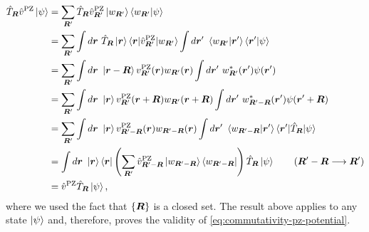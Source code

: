 \begin{equation}
    \begin{split}
        \hat{T}_{{\bm R}} \hat{v}^{\rm PZ} \ket{\psi} &= \sum_{{\bm R}'} \hat{T}_{{\bm R}} \hat{v}^{\rm PZ}_{{\bm R}'} \ket{w_{{\bm R}'}} \braket{w_{{\bm R}'}|\psi} \\
        &= \sum_{{\bm R}'} \int d{\bm r} \ \hat{T}_{{\bm R}} \ket{{\bm r}} \braket{{\bm r}|\hat{v}^{\rm PZ}_{{\bm R}'}|w_{{\bm R}'}} \int d{\bm r}' \ \braket{w_{{\bm R}'}|{\bm r}'} \braket{{\bm r}'|\psi} \\
        &= \sum_{{\bm R}'} \int d{\bm r} \ \ket{{\bm r} - {\bm R}} v^{\rm PZ}_{{\bm R}'}({\bm r}) w_{{\bm R}'}({\bm r}) \int d{\bm r}' \ w_{{\bm R}'}^*({\bm r}') \psi({\bm r}') \\
        &= \sum_{{\bm R}'} \int d{\bm r} \ \ket{{\bm r}} v^{\rm PZ}_{{\bm R}'}({\bm r} + {\bm R}) w_{{\bm R}'}({\bm r} + {\bm R}) \int d{\bm r}' \ w_{{\bm R}' - {\bm R}}^*({\bm r}') \psi({\bm r}' + {\bm R}) \\
        &= \sum_{{\bm R}'} \int d{\bm r} \ \ket{{\bm r}} v^{\rm PZ}_{{\bm R}' - {\bm R}}({\bm r}) w_{{\bm R}' - {\bm R}}({\bm r}) \int d{\bm r}' \ \braket{w_{{\bm R}' - {\bm R}}|{\bm r}'} \braket{{\bm r}'|\hat{T}_{{\bm R}}|\psi} \\
        &= \int d{\bm r} \ \ket{{\bm r}} \bra{{\bm r}} \left( \sum_{{\bm R}'} \hat{v}^{\rm PZ}_{{\bm R}' - {\bm R}} \ket{w_{{\bm R}' - {\bm R}}} \bra{w_{{\bm R}' - {\bm R}}} \right) \hat{T}_{{\bm R}} \ket{\psi} \qquad ({\bm R}' - {\bm R} \longrightarrow {\bm R}') \\
        &= \hat{v}^{\rm PZ} \hat{T}_{{\bm R}} \ket{\psi} ,
    \end{split}
    \label{eq:demonstration-commutativity}
\end{equation}
%
where we used the fact that $\{ {\bm R} \}$ is a closed set. The result above applies to any state $\ket{\psi}$ and, therefore, proves the validity of \cref{eq:commutativity-pz-potential}.

